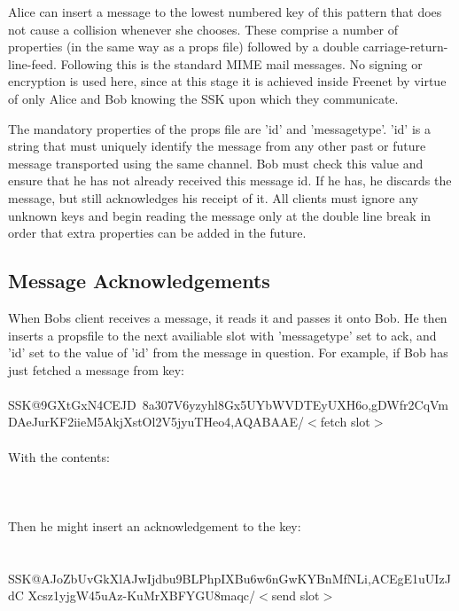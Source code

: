 \documentclass[12pt,a4paper]{article}
\begin{document}
Alice can insert a message to the lowest numbered key of this pattern that does not cause a
collision whenever she chooses. These comprise a number of properties (in the same way as a props
file) followed by a double carriage-return-line-feed. Following this is the standard MIME mail
messages. No signing or encryption is used here, since at this stage it is achieved inside Freenet
by virtue of only Alice and Bob knowing the SSK upon which they communicate.

The mandatory properties of the props file are 'id' and 'messagetype'. 'id' is a string that must
uniquely identify the message from any other past or future message transported using the same
channel. Bob must check this value and ensure that he has not already received this message id. If
he has, he discards the message, but still acknowledges his receipt of it. All clients must ignore
any unknown keys and begin reading the message only at the double line break in order that extra
properties can be added in the future.

\subsection{Message Acknowledgements}
When Bobs client receives a message, it reads it and passes it onto Bob. He then
inserts a propsfile to the next availiable slot with 'messagetype' set to ack, and 'id'
set to the value of 'id' from the message in question. For example, if Bob has just fetched a message
from key: \\
\\
SSK@9GXtGxN4CEJD~8a\-307V6yzyhl8Gx5U\-YbWVDTEyUXH6o,gDWfr2CqVm\-
DAeJurKF2iieM\-5AkjXstOl2V5j\-yuTHeo4,AQABAAE/$<$fetch slot$>$ \\
\\
With the contents: \\
\\

 \\
\\
Then he might insert an acknowledgement to the key: \\
\\
\\
SSK@AJoZbUvGkXlAJwI\-jdbu9BLPhpIXBu6\-w6nGwKYBnMfNLi,ACEgE1uUIzJdC\-
Xcsz1yjgW45u\-Az-KuMrXBFYG\-U8maqc/$<$send slot$>$ \\
\end{document}
